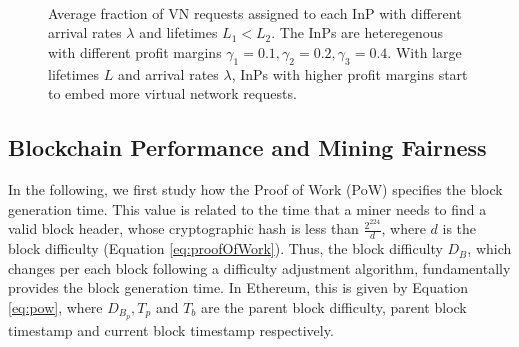 \begin{figure}[t]
	\myfloatalign
	 \quad
	 \\
	\caption{Average fraction of VN requests assigned to each InP with different arrival rates $\lambda$ and lifetimes $L_1 < L_2$. The InPs are heteregenous with different profit margins $\gamma_1 = 0.1, \gamma_2 = 0.2, \gamma_3 = 0.4$. With large lifetimes $L$ and arrival rates $\lambda$, InPs with higher profit margins start to embed more virtual network requests.}
	\label{fig:winners}
\end{figure}


\subsection{Blockchain Performance and Mining Fairness} \label{resultsBlock}

In the following, we first study how the Proof of Work (PoW) specifies the block generation time. This value is related to the time that a miner needs to find a valid block header, whose cryptographic hash is less than $\frac{2^{224}}{d}$, where $d$ is the block difficulty (Equation \ref{eq:proofOfWork}). Thus, the block difficulty $D_B$, which changes per each block following a difficulty adjustment algorithm, fundamentally provides the block generation time. In Ethereum, this is given by Equation \ref{eq:pow}, where $D_{B_p}, T_p$ and $T_b$ are the parent block difficulty, parent block timestamp and current block timestamp respectively.

